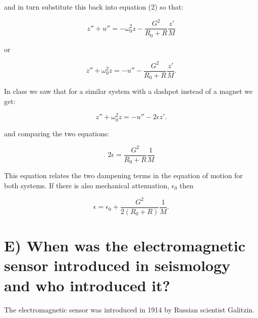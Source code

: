 \documentclass[overlapped,line,letterpaper]{res}
\begin{document}
\begin{resume}
and in turn substitute this back into equation (2) so that:

\begin{equation}
	z'' + u'' = -\omega_0^2 z - \frac{G^2}{R_0+R}\frac{z'}{M}
\end{equation}
	
or

\begin{equation}
	z'' + \omega_0^2 z  = -u'' - \frac{G^2}{R_0+R}\frac{z'}{M}.
\end{equation}

In class we saw that for a similar system with a dashpot instead of a magnet we get: 


\begin{equation}
	z'' + \omega_0^2 z  = -u'' - 2\epsilon z'.
\end{equation}

and comparing the two equations:

\begin{equation}
	2\epsilon = \frac{G^2}{R_0+R}\frac{1}{M}
\end{equation}

This equation relates the two dampening terms in the equation of motion for both systems. If there is also mechanical attenuation, $\epsilon_{0}$ then

\begin{equation}
	\epsilon = \epsilon_0 + \frac{G^2}{2(R_0+R)}\frac{1}{M}.
\end{equation}

\section{E) When was the electromagnetic sensor introduced in seismology and who introduced it?}

The electromagnetic sensor was introduced in 1914 by Russian scientist Galitzin.


\end{resume}
\end{document}
